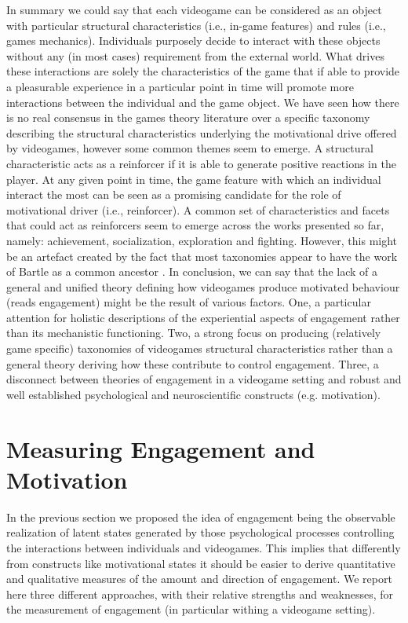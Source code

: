 In summary we could say that each videogame can be considered as an object with particular structural characteristics (i.e., in-game features) and rules (i.e., games mechanics). Individuals purposely decide to interact with these objects without any (in most cases) requirement from the external world. What drives these interactions are solely the characteristics of the game that if able to provide a pleasurable experience in a particular point in time will promote more interactions between the individual and the game object. We have seen how there is no real consensus in the games theory literature over a specific taxonomy describing the structural characteristics underlying the motivational drive offered by videogames, however some common themes seem to emerge. A structural characteristic acts as a reinforcer if it is able to generate positive reactions in the player. At any given point in time, the game feature with which an individual interact the most can be seen as a promising candidate for the role of motivational driver (i.e., reinforcer). A common set of characteristics and facets that could act as reinforcers seem to emerge across the works presented so far, namely: achievement, socialization, exploration and fighting. However, this might be an artefact created by the fact that most taxonomies appear to have the work of Bartle as a common ancestor \cite{bartle1996hearts,yee2006motivations,nacke2011brainhex}. In conclusion, we can say that the lack of a general and unified theory defining how videogames produce motivated behaviour (reads engagement) might be the result of various factors. One, a particular attention for holistic descriptions of the experiential aspects of engagement rather than its mechanistic functioning. Two, a strong focus on producing (relatively game specific) taxonomies of videogames structural characteristics rather than a general theory deriving how these contribute to control engagement. Three, a disconnect between theories of engagement in a videogame setting and robust and well established psychological and neuroscientific constructs (e.g. motivation).

\section{Measuring Engagement and Motivation}
\label{measuring_motivation_engagement}
In the previous section we proposed the idea of engagement being the observable realization of latent states generated by those psychological processes controlling the interactions between individuals and videogames. This implies that differently from constructs like motivational states it should be easier to derive quantitative and qualitative measures of the amount and direction of engagement. We report here three different approaches, with their relative strengths and weaknesses, for the measurement of engagement (in particular withing a videogame setting).

